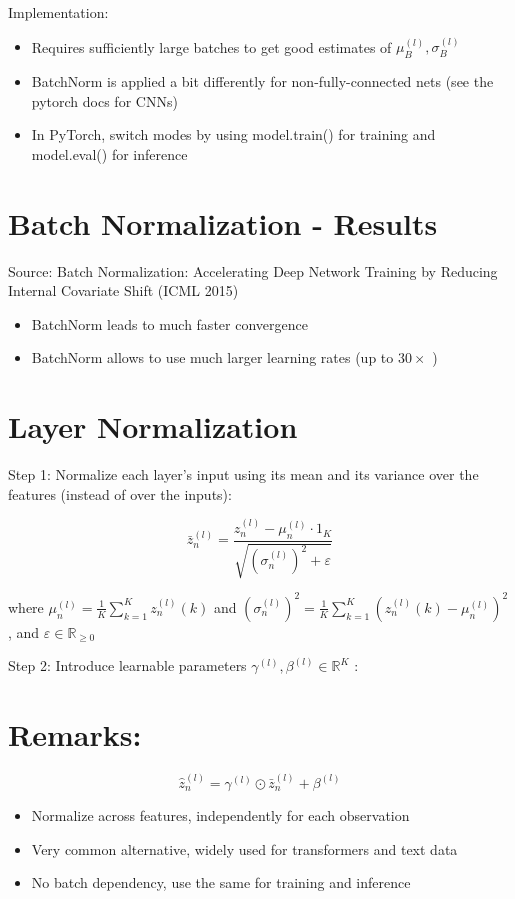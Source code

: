 Implementation:

\begin{itemize}
  \item Requires sufficiently large batches to get good estimates of $\mu_{B}^{(l)}, \sigma_{B}^{(l)}$
  \item BatchNorm is applied a bit differently for non-fully-connected nets (see the pytorch docs for CNNs)
  \item In PyTorch, switch modes by using model.train() for training and model.eval() for inference
\end{itemize}

\section*{Batch Normalization - Results}


Source: Batch Normalization: Accelerating Deep Network Training by Reducing Internal Covariate Shift (ICML 2015)

\begin{itemize}
  \item BatchNorm leads to much faster convergence
  \item BatchNorm allows to use much larger learning rates (up to $30 \times$ )
\end{itemize}

\section*{Layer Normalization}
Step 1: Normalize each layer's input using its mean and its variance over the features (instead of over the inputs):

$$
\bar{z}_{n}^{(l)}=\frac{z_{n}^{(l)}-\mu_{n}^{(l)} \cdot 1_{K}}{\sqrt{\left(\sigma_{n}^{(l)}\right)^{2}+\varepsilon}}
$$

where $\mu_{n}^{(l)}=\frac{1}{K} \sum_{k=1}^{K} z_{n}^{(l)}(k)$ and $\left(\sigma_{n}^{(l)}\right)^{2}=\frac{1}{K} \sum_{k=1}^{K}\left(z_{n}^{(l)}(k)-\mu_{n}^{(l)}\right)^{2}$, and $\varepsilon \in \mathbb{R}_{\geq 0}$

Step 2: Introduce learnable parameters $\gamma^{(l)}, \beta^{(l)} \in \mathbb{R}^{K}$ :

\section*{Remarks:}
$$
\hat{z}_{n}^{(l)}=\gamma^{(l)} \odot \bar{z}_{n}^{(l)}+\beta^{(l)}
$$

\begin{itemize}
  \item Normalize across features, independently for each observation
  \item Very common alternative, widely used for transformers and text data
  \item No batch dependency, use the same for training and inference
\end{itemize}

